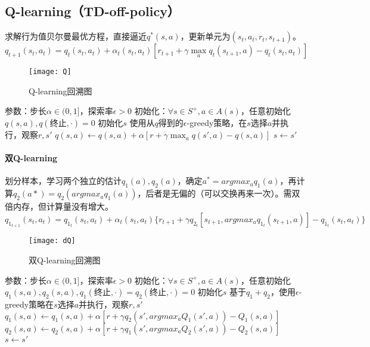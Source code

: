 \documentclass[
12pt, %
a4paper, 
oneside, %
headinclude,footinclude, %
]{scrartcl}
\begin{document}
\subsection[Q-learning]{Q-learning（TD-off-policy）}
求解行为值贝尔曼最优方程，直接逼近$ q^*(s, a) $，更新单元为$ (s_t, a_t, r_t, s_{t + 1}) $。
$$ q_{t + 1}(s_t, a_t) = q_t(s_t, a_t) + \alpha_t(s_t, a_t)[r_{t + 1} + \gamma \max_a q_t(s_{t + 1}, a) - q_t(s_t, a_t)] $$

\begin{figure}[H]
\centering
\texttt{[image: Q]}
\caption{Q-learning回溯图}
\end{figure}
\begin{myalgorithm}
\State 参数：步长$ \alpha \in (0, 1] $，探索率$ \epsilon > 0 $
\State 初始化：$ \forall s \in S^+, a \in A(s) $，任意初始化$ q(s, a), q(\text{终止}, \cdot) = 0 $
\State 初始化$ s $
\State 使用从$ q $得到的$ \epsilon $-greedy策略，在$ s $选择$ a $并执行，观察$ r, s' $
\State $ q(s, a) \gets q(s, a) + \alpha [r + \gamma \max_a q(s', a) - q(s, a)] $
\State $ s \gets s' $
\EndWhile
\EndFor
\end{myalgorithm}
\paragraph{双Q-learning}
划分样本，学习两个独立的估计$ q_1(a), q_2(a) $，确定$ a^* = argmax_a q_1(a) $，再计算$ q_2(a*) = q_2(argmax_a q_1(a)) $，后者是无偏的（可以交换再来一次）。需双倍内存，但计算量没有增大。
$$ q_{1_{t + 1}}(s_t, a_t) = q_{1_t}(s_t, a_t) + \alpha_t(s_t, a_t)\{r_{t + 1} + \gamma q_{2_t}[s_{t + 1}, argmax_a q_{1_t}(s_{t + 1}, a)] - q_{1_t}(s_t, a_t)\} $$

\begin{figure}[H]
\centering
\texttt{[image: dQ]}
\caption{双Q-learning回溯图}
\end{figure}
\begin{myalgorithm}[双Q-learning]
\State 参数：步长$ \alpha \in (0, 1] $，探索率$ \epsilon > 0 $
\State 初始化：$ \forall s \in S^+, a \in A(s) $，任意初始化$ q_1(s, a), q_2(s, a), q_1(\text{终止}, \cdot) = q_2(\text{终止}, \cdot) = 0 $
\State 初始化$ s $
\State 基于$ q_1 + q_2 $，使用$ \epsilon $-greedy策略在$ s $选择$ a $并执行，观察$ r, s' $
\State $ q_1(s, a) \gets q_1(s, a) + \alpha [r + \gamma q_2(s', argmax_a Q_1(s',a)) - Q_1(s, a)] $
\Else
\State $ q_2(s, a) \gets q_2(s, a) + \alpha [r + \gamma q_1(s', argmax_a Q_2(s',a)) - Q_2(s, a)] $
\EndIf
\State $ s \gets s' $
\EndWhile
\EndFor
\end{myalgorithm}
\end{document}
